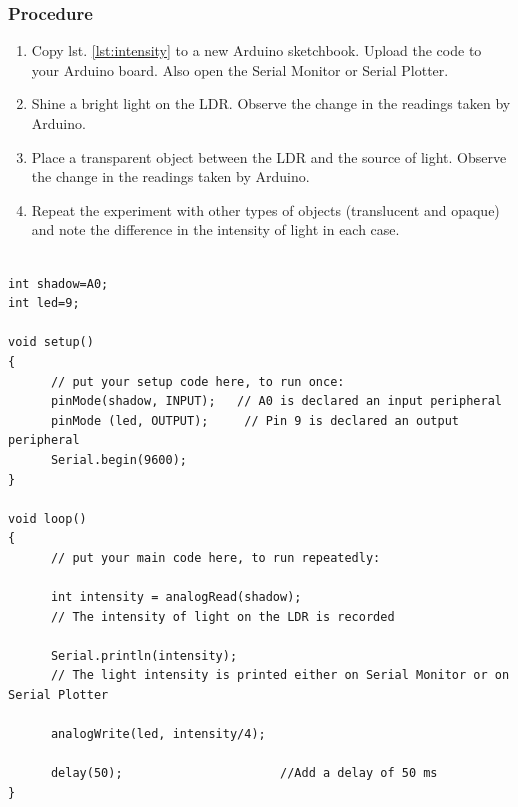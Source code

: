 \subsubsection*{Procedure}
\begin{enumerate}[leftmargin=*]
    \item Copy lst. \ref{lst:intensity} to a new Arduino sketchbook. Upload the code to your Arduino board. Also open the Serial Monitor or Serial Plotter.
    \item Shine a bright light on the LDR. Observe the change in the readings taken by Arduino.
    \item Place a transparent object between the LDR and the source of light. Observe the change in the readings taken by Arduino.
    \item Repeat the experiment with other types of objects (translucent and opaque) and note the difference in the intensity of light in each case.
\end{enumerate}
\begin{lstlisting}[language=Arduino, numbers=none, caption={Arduino code for measuring the intensity of light detected by LDR}, captionpos=b, label={lst:intensity}]

int shadow=A0;  
int led=9;

void setup() 
{
      // put your setup code here, to run once:
      pinMode(shadow, INPUT);   // A0 is declared an input peripheral
      pinMode (led, OUTPUT);     // Pin 9 is declared an output peripheral
      Serial.begin(9600);
}

void loop() 
{
      // put your main code here, to run repeatedly:
      
      int intensity = analogRead(shadow);    
      // The intensity of light on the LDR is recorded
      
      Serial.println(intensity);          
      // The light intensity is printed either on Serial Monitor or on Serial Plotter
      
      analogWrite(led, intensity/4);    
            
      delay(50);                      //Add a delay of 50 ms
}

\end{lstlisting}
